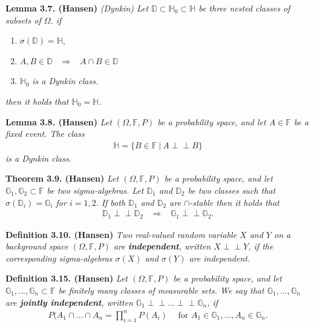 \documentclass[
]{book}
\providecommand{\tightlist}{%
  \setlength{\itemsep}{0pt}\setlength{\parskip}{0pt}}
\begin{document}
\textbf{Lemma 3.7. (Hansen)} \emph{(Dynkin) Let \(\mathbb{D}\subset \mathbb{H}_0\subset \mathbb{H}\) be three nested classes of subsets of \(\Omega\). if}

\begin{enumerate}
\def\labelenumi{\arabic{enumi}.}
\tightlist
\item
  \(\sigma(\mathbb{D})=\mathbb{H}\),
\item
  \(A,B\in\mathbb{D}\hspace{10pt}\Rightarrow\hspace{10pt}A\cap B\in\mathbb{D}\)
\item
  \(\mathbb{H}_0\) \emph{is a Dynkin class.}
\end{enumerate}

\emph{then it holds that \(\mathbb{H}_0=\mathbb{H}\).}

\textbf{Lemma 3.8. (Hansen)} \emph{Let \((\Omega,\mathbb{F},P)\) be a probability space, and let \(A\in\mathbb{F}\) be a fixed event. The class}
\begin{align*}
    \mathbb{H}=\{B\in \mathbb{F}\ \vert\ A\perp \!\!\! \perp B\}
\end{align*}
\emph{is a Dynkin class.}

\textbf{Theorem 3.9. (Hansen)} \emph{Let \((\Omega,\mathbb{F},P)\) be a probability space, and let \(\mathbb{G}_1,\mathbb{G}_2\subset \mathbb{F}\) be two sigma-algebras. Let \(\mathbb{D}_1\) and \(\mathbb{D}_2\) be two classes such that \(\sigma(\mathbb{D}_i)=\mathbb{G}_i\) for \(i=1,2\).}
\emph{If both \(\mathbb{D}_1\) and \(\mathbb{D}_2\) are \(\cap\)-stable then it holds that}
\begin{align*}
    \mathbb{D}_1\perp \!\!\! \perp\mathbb{D}_2\hspace{10pt}\Rightarrow \hspace{10pt} \mathbb{G}_1\perp \!\!\! \perp\mathbb{G}_2.
\end{align*}

\textbf{Definition 3.10. (Hansen)} \emph{Two real-valued random variable \(X\) and \(Y\) on a background space \((\Omega,\mathbb{F},P)\) are \textbf{independent}, written \(X\perp \!\!\! \perp Y\), if the corresponding sigma-algebras \(\sigma(X)\) and \(\sigma(Y)\) are independent.}

\textbf{Definition 3.15. (Hansen)} \emph{Let \((\Omega,\mathbb{F},P)\) be a probability space, and let \(\mathbb{G}_1,...,\mathbb{G}_n\subset \mathbb{F}\) be finitely many classes of measurable sets. We say that \(\mathbb{G}_1,...,\mathbb{G}_n\) are \textbf{jointly independent}, written \(\mathbb{G}_1\perp \!\!\! \perp...\perp \!\!\! \perp\mathbb{G}_n\), if}
\begin{align*}
    P(A_1\cap ...\cap A_n=\prod_{i=1}^nP(A_i)\hspace{15pt}\text{for }A_1\in\mathbb{G}_1,...,A_n\in\mathbb{G}_n.\tag{3.8}
\end{align*}
\end{document}
